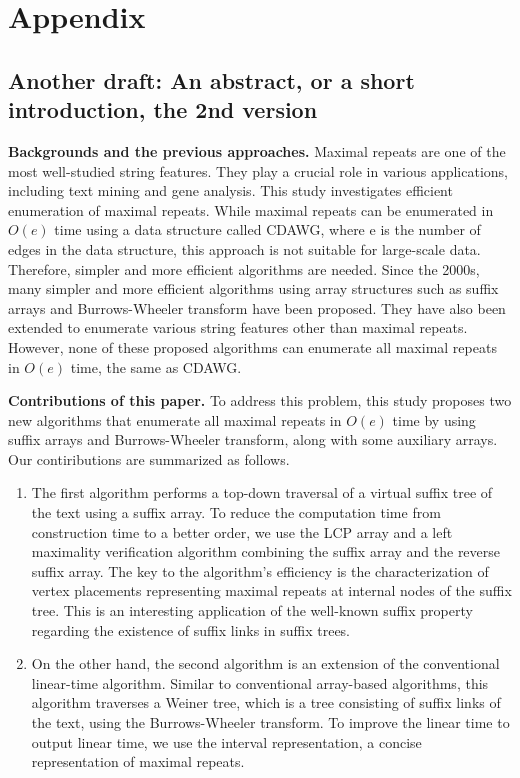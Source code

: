 \section{Appendix}
\subsection{Another draft: An abstract, or a short introduction, the 2nd version}

\textbf{Backgrounds and the previous approaches.}
Maximal repeats are one of the most well-studied string features. They play a crucial role in various applications, including text mining and gene analysis. This study investigates efficient enumeration of maximal repeats. While maximal repeats can be enumerated in $O(e)$ time using a data structure called CDAWG, where e is the number of edges in the data structure, this approach is not suitable for large-scale data. Therefore, simpler and more efficient algorithms are needed. 
Since the 2000s, many simpler and more efficient algorithms using array structures such as suffix arrays and Burrows-Wheeler transform have been proposed. They have also been extended to enumerate various string features other than maximal repeats. However, none of these proposed algorithms can enumerate all maximal repeats in $O(e)$ time, the same as CDAWG. 

\textbf{Contributions of this paper.}
To address this problem, this study proposes two new algorithms that enumerate all maximal repeats in $O(e)$ time by using suffix arrays and Burrows-Wheeler transform, along with some auxiliary arrays. Our contiributions are summarized as follows. 

\begin{enumerate}
\item 
The first algorithm performs a top-down traversal of a virtual suffix tree of the text using a suffix array. To reduce the computation time from construction time to a better order, we use the LCP array and a left maximality verification algorithm combining the suffix array and the reverse suffix array. The key to the algorithm's efficiency is the characterization of vertex placements representing maximal repeats at internal nodes of the suffix tree. This is an interesting application of the well-known suffix property regarding the existence of suffix links in suffix trees. 

\item 
On the other hand, the second algorithm is an extension of the conventional linear-time algorithm. Similar to conventional array-based algorithms, this algorithm traverses a Weiner tree, which is a tree consisting of suffix links of the text, using the Burrows-Wheeler transform. To improve the linear time to output linear time, we use the interval representation, a concise representation of maximal repeats. 
\end{enumerate}

